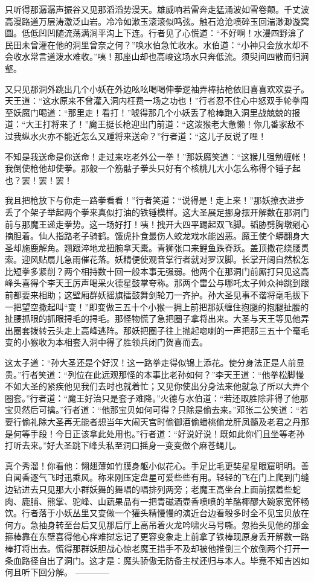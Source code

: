 \documentclass[12pt,UTF8]{ctexbook}
\begin{document}
只听得那潺潺声振谷又见那滔滔势漫天。雄威响若雷奔走猛涌波如雪卷颠。千丈波高漫路道万层涛激泛山岩。冷冷如漱玉滚滚似鸣弦。触石沧沧喷碎玉回湍渺渺漩窝圆。低低凹凹随流荡满涧平沟上下连。行者见了心慌道：“不好啊！水漫四野渰了民田未曾灌在他的洞里曾奈之何？”唤水伯急忙收水。水伯道：“小神只会放水却不会收水常言道泼水难收。”咦！那座山却也高峻这场水只奔低流。须臾间四散而归涧壑。

又只见那洞外跳出几个小妖在外边吆吆喝喝伸拳逻袖弄棒拈枪依旧喜喜欢欢耍子。天王道：“这水原来不曾灌入洞内枉费一场之功也！”行者忍不住心中怒双手轮拳闯至妖魔门喝道：“那里走！看打！”唬得那几个小妖丢了枪棒跑入洞里战兢兢的报道：“大王打将来了！”魔王挺长枪迎出门前道：“这泼猴老大惫懒！你几番家敌不过我纵水火亦不能近怎么又踵将来送命？”行者道：“这儿子反说了哩！

不知是我送命是你送命！走过来吃老外公一拳！”那妖魔笑道：“这猴儿强勉缠帐！我倒使枪他却使拳。那般一个筋骷子拳头只好有个核桃儿大小怎么称得个锤子起也？罢！罢！罢！

我且把枪放下与你走一路拳看看！”行者笑道：“说得是！走上来！”那妖撩衣进步丢了个架子举起两个拳来真似打油的铁锤模样。这大圣展足挪身摆开解数在那洞门前与那魔王递走拳势。这一场好打！咦！拽开大四平踢起双飞脚。韬胁劈胸墩剜心摘胆着。仙人指路老子骑鹤。饿虎扑食最伤人蛟龙戏水能凶恶。魔王使个蟒翻身大圣却施鹿解角。翘跟淬地龙扭腕拿天橐。青狮张口来鲤鱼跌脊跃。盖顶撒花绕腰贯索。迎风贴扇儿急雨催花落。妖精便使观音掌行者就对罗汉脚。长掌开阔自然松怎比短拳多紧削？两个相持数十回一般本事无强弱。他两个在那洞门前厮打只见这高峰头喜得个李天王厉声喝采火德星鼓掌夸称。那两个雷公与哪吒太子帅众神跳到跟前都要来相助；这壁厢群妖摇旗擂鼓舞剑轮刀一齐护。孙大圣见事不谐将毫毛拔下一把望空撒起叫“变！”即变做三五十个小猴一拥上前把那妖缠住抱腿的抱腿扯腰的扯腰抓眼的抓眼挦毛的挦毛。那怪物慌了急把圈子拿将出来。大圣与天王等见他弄出圈套拨转云头走上高峰逃阵。那妖把圈子往上抛起唿喇的一声把那三五十个毫毛变的小猴收为本相套入洞中得了胜领兵闭门贺喜而去。

这太子道：“孙大圣还是个好汉！这一路拳走得似锦上添花。使分身法正是人前显贵。”行者笑道：“列位在此远观那怪的本事比老孙如何？”李天王道：“他拳松脚慢不如大圣的紧疾他见我们去时也就着忙；又见你使出分身法来他就急了所以大弄个圈套。”行者道：“魔王好治只是套子难降。”火德与水伯道：“若还取胜除非得了他那宝贝然后可擒。”行者道：“他那宝贝如何可得？只除是偷去来。”邓张二公笑道：“若要行偷礼除大圣再无能者想当年大闹天宫时偷御酒偷蟠桃偷龙肝凤髓及老君之丹那是何等手段！今日正该拿此处用也。”行者道：“好说好说！既如此你们且坐等老孙打听去来。”好大圣跳下峰头私至洞口摇身一变变做个麻苍蝇儿。

真个秀溜！你看他：翎翅薄如竹膜身躯小似花心。手足比毛更奘星星眼窟明明。善自闻香逐气飞时迅乘风。称来刚压定盘星可爱些些有用。轻轻的飞在门上爬到门缝边钻进去只见那大小群妖舞的舞唱的唱排列两旁；老魔王高坐台上面前摆着些蛇肉、鹿脯、熊掌、驼峰、山蔬果品有一把青磁酒壶香喷喷的羊酪椰醪大碗家宽怀畅饮。行者落于小妖丛里又变做一个獾头精慢慢的演近台边看彀多时全不见宝贝放在何方。急抽身转至台后又见那后厅上高吊着火龙吟啸火马号嘶。忽抬头见他的那金箍棒靠在东壁喜得他心痒难挝忘记了更容变象走上前拿了铁棒现原身丢开解数一路棒打将出去。慌得那群妖胆战心惊老魔王措手不及却被他推倒三个放倒两个打开一条血路径自出了洞门。这才是：魔头骄傲无防备主杖还归与本人。毕竟不知吉凶如何且听下回分解。
------------
\end{document}
